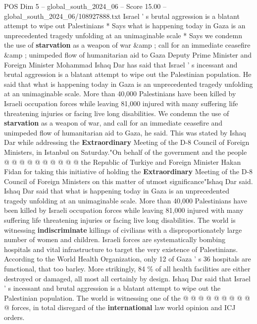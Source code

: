 \begin{textsample}{POS Dim 5 – global\_south\_2024\_06 – Score 15.00 – global\_south\_2024\_06/108927888.txt}  \label{ex:f5_pos_225}
Israel ' s brutal aggression is a blatant attempt to wipe out Palestinians * Says what is happening today in Gaza is an unprecedented tragedy unfolding at an unimaginable scale * Says we condemn the use of \textbf{starvation} as a weapon of war \&amp ; call for an immediate ceasefire \&amp ; unimpeded flow of humanitarian aid to Gaza Deputy Prime Minister and Foreign Minister Mohammad Ishaq Dar has said that Israel ' s incessant and brutal aggression is a blatant attempt to wipe out the Palestinian population.
He said that what is happening today in Gaza is an unprecedented tragedy unfolding at an unimaginable scale.
More than 40,000 Palestinians have been killed by Israeli occupation forces while leaving 81,000 injured with many suffering life threatening injuries or facing live long disabilities.
We condemn the use of \textbf{starvation} as a weapon of war, and call for an immediate ceasefire and unimpeded flow of humanitarian aid to Gaza, he said.
This was stated by Ishaq Dar while addressing the \textbf{Extraordinary} Meeting of the D-8 Council of Foreign Ministers, in Istanbul on Saturday."On behalf of the government and the people @ @ @ @ @ @ @ @ @ @ the Republic of Turkiye and Foreign Minister Hakan Fidan for taking this initiative of holding the \textbf{Extraordinary} Meeting of the D-8 Council of Foreign Ministers on this matter of utmost significance"Ishaq Dar said.
Ishaq Dar said that what is happening today in Gaza is an unprecedented tragedy unfolding at an unimaginable scale.
More than 40,000 Palestinians have been killed by Israeli occupation forces while leaving 81,000 injured with many suffering life threatening injuries or facing live long disabilities.
The world is witnessing \textbf{indiscriminate} killings of civilians with a disproportionately large number of women and children.
Israeli forces are systematically bombing hospitals and vital infrastructure to target the very existence of Palestinians.
According to the World Health Organization, only 12 of Gaza ' s 36 hospitals are functional, that too barley.
More strikingly, 84 \% of all health facilities are either destroyed or damaged, all most all certainly by design.
Ishaq Dar said that Israel ' s incessant and brutal aggression is a blatant attempt to wipe out the Palestinian population.
The world is witnessing one of the @ @ @ @ @ @ @ @ @ @ forces, in total disregard of the \textbf{international} law world opinion and ICJ orders.

\end{textsample}
